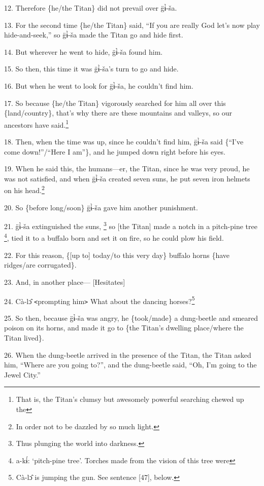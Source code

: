 12. Therefore \{he/the Titan\} did not prevail over g̈ɨ̀-ša.

13. For the second time \{he/the Titan\} said, ``If you are really God let's now
play hide-and-seek,'' so g̈ɨ̀-ša made the Titan go and hide first.

14. But wherever he went to hide, g̈ɨ̀-ša found him.

15. So then, this time it was g̈ɨ̀-ša's turn to go and hide.

16. But when he went to look for g̈ɨ̀-ša, he couldn't find him.

17. So because \{he/the Titan\} vigorously searched for him all over this \{land/country\},
that's why there are these mountains and valleys, so our ancestors have said.\footnote{That is, the Titan's clumsy but awesomely powerful searching chewed up the}

18. Then, when the time was up, since he couldn't find him, g̈ɨ̀-ša said \{``I've
come down!''/``Here I am''\}, and he jumped down right before his eyes.

19. When he said this, the humans---er, the Titan, since he was very proud, he
was not satisfied, and when g̈ɨ̀-ša created seven suns, he put seven iron helmets
on his head.\footnote{In order not to be dazzled by so much light.}

20. So \{before long/soon\} g̈ɨ̀-ša gave him another punishment.

21. g̈ɨ̀-ša extinguished the suns, \footnote{Thus plunging the world into darkness.} so [the Titan] made a notch in a pitch-pine
tree \footnote{a-kɨ́: `pitch-pine tree'. Torches made from the vision of this tree were}, tied it to a buffalo born and set it on fire, so he could plow his field.

22. For this reason, \{[up to] today/to this very day\} buffalo horns \{have ridges/are
corrugated\}.

23. And, in another place--- [Hesitates]

24. Cà-lɔ̂ \texttt{<}prompting him\texttt{>} What about the dancing horses?\footnote{Cà-lɔ̂ is jumping the gun. See sentence [47], below.}

25. So then, because g̈ɨ̀-ša was angry, he \{took/made\} a dung-beetle and
smeared poison on its horns, and made it go to \{the Titan's dwelling place/where
the Titan lived\}.

26. When the dung-beetle arrived in the presence of the Titan, the Titan asked
him, ``Where are you going to?'', and the dung-beetle said, ``Oh, I'm going to
the Jewel City.''

